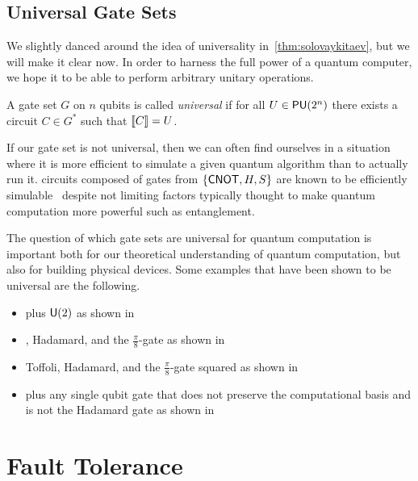 \subsection{Universal Gate Sets}\label{sec:universal}

We slightly danced around the idea of universality in~\cref{thm:solovaykitaev}, but we will make it clear now.
In order to harness the full power of a quantum computer, we hope it to be able to perform arbitrary unitary operations.
\begin{definition}
    A gate set $G$ on $n$ qubits is called \emph{universal} if for all $U \in \mathsf{PU} (2^n)$ there exists a circuit $C\in G^*$ such that $\llbracket C\rrbracket = U$.
\end{definition}
If our gate set is not universal, then we can often find ourselves in a situation where it is more efficient to simulate a given quantum algorithm than to actually run it.
\Eg{} circuits composed of gates from $\qty{\ensuremath{\mathsf{CNOT}}, H, S}$ are known to be efficiently simulable~\cite{gottesman-knill} despite not limiting factors typically thought to make quantum computation more powerful such as entanglement.

The question of which gate sets are universal for quantum computation is important both for our theoretical understanding of quantum computation, but also for building physical devices.
Some examples that have been shown to be universal are the following.
\begin{itemize}
    \item \CNOT{} plus $\mathsf{U} (2)$ as shown in~\cite{universal-cnot-u2}
    \item \CNOT{}, Hadamard, and the $\frac{\pi}{8}$-gate as shown in~\cite{universal-cnot-had-p8}
    \item Toffoli, Hadamard, and the $\frac{\pi}{8}$-gate squared as shown in~\cite{bigkitaev}
    \item \CNOT{} plus any single qubit gate that does not preserve the computational basis and is not the Hadamard gate as shown in~\cite{universal-cnot-basis-change}
\end{itemize}

\section{Fault Tolerance}\label{sec:ft}

